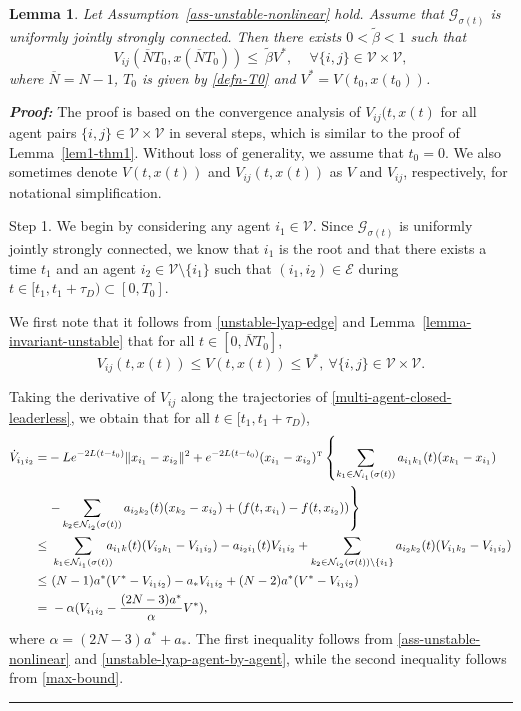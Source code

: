 \documentclass[a4paper, 11pt]{article}
\newcommand{\T}{^{\mbox{\tiny T}}}
\newtheorem{lemma}{Lemma}
\newenvironment{IEEEproof}[1][\bf Proof]{\smallskip\par\noindent\textit{#1: }}{\hspace*{\fill} \rule{6pt}{6pt}\smallskip}
\begin{document}
\begin{lemma}\label{lem-thm-unstable}
Let Assumption~\ref{ass-unstable-nonlinear} hold. Assume that $\mathcal{G}_{\sigma(t)}$ is uniformly jointly strongly connected. Then there exists $0<\tilde{\beta}<1$ such that
\begin{equation*}\label{unstable-lyap-agent}
V_{ij}(\overline{N}T_0, x(\overline{N}T_0))\leq ~\tilde{\beta}V^*, \quad \, \forall \{i,j\}\in\mathcal{V}\times\mathcal{V},
\end{equation*}
where $\overline{N}=N-1$, $T_0$ is given by \eqref{defn-T0} and $V^*=V(t_0,x(t_0))$.
\end{lemma}

\begin{IEEEproof}
The proof is based on the convergence analysis of $V_{ij}(t,x(t)$ for all agent pairs $\{i,j\}\in\mathcal{V}\times\mathcal{V}$
in several steps, which is similar to the proof of Lemma~\ref{lem1-thm1}. Without loss of generality, we assume that $t_0=0$. We also sometimes denote $V(t,x(t))$ and $V_{ij}(t,x(t))$ as $V$ and $V_{ij}$, respectively, for notational simplification.

\noindent Step 1. We begin by considering any agent $i_1\in\mathcal{V}$. Since $\mathcal{G}_{\sigma(t)}$ is uniformly jointly strongly connected, we know that
$i_1$ is the root and that there exists a time $t_1$ and an agent $i_2\in\mathcal{V}\setminus\{i_1\}$ such that $(i_1,i_2)\in \mathcal{E}$ during $t\in[t_1,t_1+\tau_D)\subset[0,T_0]$.

We first note that it follows from \eqref{unstable-lyap-edge} and Lemma~\ref{lemma-invariant-unstable} that for all $t\in[0,\overline{N}T_0]$,
\begin{equation}\label{max-bound}
V_{ij}(t,x(t))\leq V(t,x(t)) \leq V^*, ~\forall \{i,j\}\in\mathcal{V}\times\mathcal{V}.
\end{equation}

Taking the derivative of $V_{ij}$ along the trajectories of \eqref{multi-agent-closed-leaderless}, we obtain that for all $t\in[t_1,t_1+\tau_D)$,
\begin{align*}
\dot V_{i_1i_2} =& -Le^{-2L(t-t_0)}\|x_{i_1}-x_{i_2}\|^2+e^{-2L(t-t_0)}(x_{i_1}-x_{i_2})\T \left\{ \sum_{k_1\in\mathcal{N}_{i_1}(\sigma(t))}
a_{i_1k_1}(t)(x_{k_1}-x_{i_1}) \right.
\\ & \left.
-\sum_{k_2\in\mathcal{N}_{i_2}(\sigma(t))}a_{i_2k_2}(t)(x_{k_2}-x_{i_2})+(f(t,x_{i_1})-f(t,x_{i_2}))\right\}
\\ \leq &~\sum_{k_1\in\mathcal{N}_{i_1}(\sigma(t))}\!\!\!\!a_{i_1k}(t)(V_{i_2k_1}-V_{i_1i_2})-a_{i_2i_1}(t)V_{i_1i_2}+\sum_{k_2 \in\mathcal{N}_{i_2}(\sigma(t))\backslash\{i_1\}}a_{i_2k_2}(t)(V_{i_1k_2}-V_{i_1i_2})
\\ \leq &~(N-1)a^*(V^*-V_{i_1i_2})-a_*V_{i_1i_2}+(N-2)a^*(V^*-V_{i_1i_2})
\\ = & ~-\alpha(V_{i_1i_2}-\frac{(2N-3)a^*}{\alpha}V^*),
\end{align*}
where $\alpha=(2N-3)a^*+a_*$. The first inequality follows from \eqref{ass-unstable-nonlinear} and \eqref{unstable-lyap-agent-by-agent}, while the second inequality follows from \eqref{max-bound}.


\end{IEEEproof}
\end{document}
